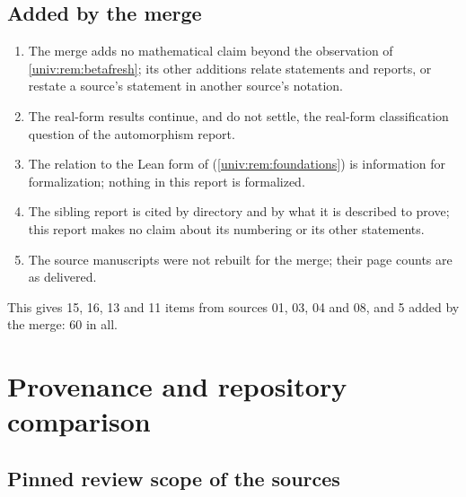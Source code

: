\documentclass[11pt,letterpaper]{article}
\numberwithin{equation}{section}
\theoremstyle{definition}
\theoremstyle{remark}
\begin{document}
\subsection*{Added by the merge}
\begin{enumerate}[label=M.\arabic*,leftmargin=3.2em]
\item The merge adds no mathematical claim beyond the observation of
\cref{univ:rem:betafresh}; its other additions relate statements and reports,
or restate a source's statement in another source's notation.
\item The real-form results continue, and do not settle, the real-form
classification question of the automorphism report.
\item The relation to the Lean form of 
(\cref{univ:rem:foundations}) is information for formalization; nothing in this
report is formalized.
\item The sibling report is cited by directory and by what it is described to
prove; this report makes no claim about its numbering or its other statements.
\item The source manuscripts were not rebuilt for the merge; their page counts
are as delivered.
\end{enumerate}
This gives 15, 16, 13 and 11 items from sources 01, 03, 04 and 08, and 5 added
by the merge: 60 in all.

\appendix
\section{Provenance and repository comparison}\label{univ:app:audit}

\subsection{Pinned review scope of the sources}
\end{document}

